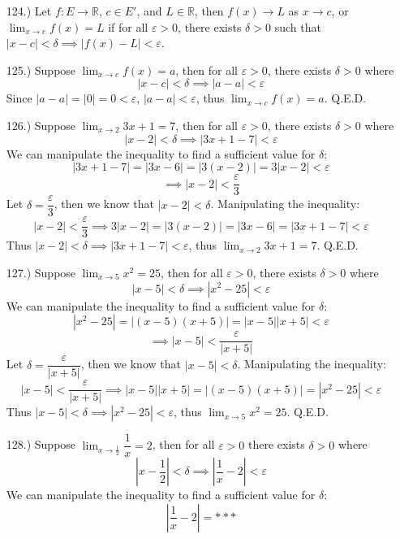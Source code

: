 \documentclass[12pt]{article}
\newcommand{\vertb}[1]{\left\vert#1\right\vert}
\newcommand{\e}{\varepsilon}
\newcommand{\lm}[1]{\displaystyle\lim_{#1}}
\begin{document}
\begin{itemize}



    \item [124.)] Let $f:E\to\mathbb{R}$, $c\in E'$, and $L\in\mathbb{R}$, then $f(x)\to L$ as $x\to c$, or $\displaystyle\lim_{x\to c}f(x)=L$ if for all $\varepsilon>0$, there exists $\delta>0$ such that $\vertb{x-c}<\delta\implies\vertb{f(x)-L}<\varepsilon$.

    \item [125.)] Suppose $\displaystyle\lim_{x\to c}f(x)=a$, then for all $\varepsilon>0$, there exists $\delta>0$ where
    \[\vertb{x-c}<\delta\implies\vertb{a-a}<\varepsilon\]
    Since $\vertb{a-a}=\vertb{0}=0<\varepsilon$, $\vertb{a-a}<\varepsilon$, thus $\displaystyle\lim_{x\to c}f(x)=a$. Q.E.D.

    \item [126.)] Suppose $\lm{x\to2}3x+1=7$, then for all $\varepsilon>0$, there exists $\delta>0$ where
    \[\vertb{x-2}<\delta\implies\vertb{3x+1-7}<\e\]
    We can manipulate the inequality to find a sufficient value for $\delta$:
    \[\vertb{3x+1-7}=\vertb{3x-6}=\vertb{3(x-2)}=3\vertb{x-2}<\e\]
    \[\implies\vertb{x-2}<\frac{\e}{3}\]
    Let $\delta=\dfrac{\e}{3}$, then we know that $\vertb{x-2}<\delta$. Manipulating the inequality:
    \[\vertb{x-2}<\dfrac{\e}{3}\implies3\vertb{x-2}=\vertb{3(x-2)}=\vertb{3x-6}=\vertb{3x+1-7}<\e\]
    Thus $\vertb{x-2}<\delta\implies\vertb{3x+1-7}<\e$, thus $\lm{x\to2}3x+1=7$. Q.E.D.

    \item [127.)] Suppose $\lm{x\to5}x^2=25$, then for all $\e>0$, there exists $\delta>0$ where
    \[\vertb{x-5}<\delta\implies\vertb{x^2-25}<\e\]
    We can manipulate the inequality to find a sufficient value for $\delta$:
    \[\vertb{x^2-25}=\vertb{(x-5)(x+5)}=\vertb{x-5}\vertb{x+5}<\e\]
    \[\implies\vertb{x-5}<\frac{\e}{\vertb{x+5}}\]
    Let $\delta=\dfrac{\e}{\vertb{x+5}}$, then we know that $\vertb{x-5}<\delta$. Manipulating the inequality:
    \[\vertb{x-5}<\frac{\varepsilon}{\vertb{x+5}}\implies\vertb{x-5}\vertb{x+5}=\vertb{(x-5)(x+5)}=\vertb{x^2-25}<\e\]
    Thus $\vertb{x-5}<\delta\implies\vertb{x^2-25}<\e$, thus $\lm{x\to5}x^2=25$. Q.E.D.

    \item [128.)] Suppose $\lm{x\to\frac{1}{2}}\dfrac{1}{x}=2$, then for all $\e>0$ there exists $\delta>0$ where
    \[\vertb{x-\frac{1}{2}}<\delta\implies\vertb{\frac{1}{x}-2}<\e\]
    We can manipulate the inequality to find a sufficient value for $\delta$:
    \[\vertb{\frac{1}{x}-2}=***\]



\end{itemize}
\end{document}

